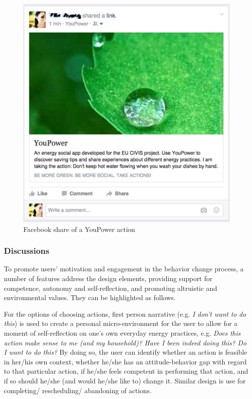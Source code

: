 \documentclass[a4paper]{article}
\begin{document}
\begin{figure}[t!]
\centering
\includegraphics[width=0.55\linewidth]{img/share}
\caption{Facebook share of a YouPower action}
\label{fig:share}
\end{figure}

\subsubsection{Discussions} 
\label{sec:example:motivation:discussions}

To promote users' motivation and engagement in the behavior change process, a number of features address the design elements, providing support for competence, autonomy and self-reflection, and promoting altruistic and environmental values. They can be highlighted as follows.

For the options of choosing actions, first person narrative (e.g. \textit{I don't want to do this}) is used to create a personal micro-environment for the user \citep{Crumlish2009} to allow for a moment of self-reflection on one's own everyday energy practices, e.g. \textit{Does this action make sense to me (and my household)? Have I been indeed doing this? Do I want to do this?} By doing so, the user can identify whether an action is feasible in her/his own context, whether he/she has an attitude-behavior gap with regard to that particular action, if he/she feels competent in performing that action, and if so should he/she (and would he/she like to) change it. Similar design is use for completing/ rescheduling/ abandoning of actions. 
\end{document}
